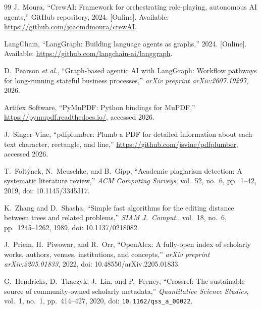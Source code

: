 \documentclass[conference]{IEEEtran}
\begin{document}
\begin{thebibliography}{99}
J.~Moura, ``CrewAI: Framework for orchestrating role-playing, autonomous AI agents,'' GitHub repository, 2024. [Online]. Available: \url{https://github.com/joaomdmoura/crewAI}.

LangChain, ``LangGraph: Building language agents as graphs,'' 2024. [Online]. Available: \url{https://github.com/langchain-ai/langgraph}.

D.~Pearson \emph{et al.}, ``Graph-based agentic AI with LangGraph: Workflow pathways for long-running stateful business processes,'' \emph{arXiv preprint arXiv:2607.19297}, 2026.

Artifex Software, ``PyMuPDF: Python bindings for MuPDF,'' \url{https://pymupdf.readthedocs.io/}, accessed 2026.

J.~Singer-Vine, ``pdfplumber: Plumb a PDF for detailed information about each text character, rectangle, and line,'' \url{https://github.com/jsvine/pdfplumber}, accessed 2026.

T.~Folt\'{y}nek, N.~Meuschke, and B.~Gipp, ``Academic plagiarism detection: A systematic literature review,'' \emph{ACM Computing Surveys}, vol.~52, no.~6, pp.~1--42, 2019, doi: 10.1145/3345317.

K.~Zhang and D.~Shasha, ``Simple fast algorithms for the editing distance between trees and related problems,'' \emph{SIAM J.\ Comput.}, vol.~18, no.~6, pp.~1245--1262, 1989, doi: 10.1137/0218082.

J.~Priem, H.~Piwowar, and R.~Orr, ``OpenAlex: A fully-open index of scholarly works, authors, venues, institutions, and concepts,'' \emph{arXiv preprint arXiv:2205.01833}, 2022, doi: 10.48550/arXiv.2205.01833.

G.~Hendricks, D.~Tkaczyk, J.~Lin, and P.~Feeney, ``Crossref: The sustainable source of community-owned scholarly metadata,'' \emph{Quantitative Science Studies}, vol.~1, no.~1, pp.~414--427, 2020, doi: \texttt{10.1162/qss\_a\_00022}.

\end{thebibliography}
\end{document}
